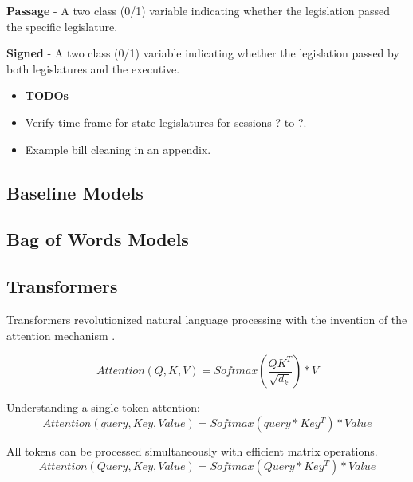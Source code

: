 \documentclass[11pt]{article}
\begin{document}
\textbf{Passage} - A two class (0/1) variable indicating whether the legislation passed the specific legislature. 

\textbf{Signed} - A two class (0/1) variable indicating whether the legislation passed by both legislatures and the executive.


\begin{itemize}
  \item \textbf{TODOs}
  \item Verify time frame for state legislatures for sessions ? to ?.
  \item Example bill cleaning in an appendix.

\end{itemize}

\subsection{Baseline Models}

\subsection{Bag of Words Models}

\subsection{Transformers}

Transformers revolutionized natural language processing with the invention of the attention mechanism \cite{attentionisallyouneed}.

\begin{equation}
Attention(Q,K,V) = Softmax(\frac{QK^T}{\sqrt{d_k}}) * V
\end{equation}


Understanding a single token attention:
\begin{equation}
Attention(query, Key, Value) = Softmax(query * Key^T) * Value
\end{equation}

All tokens can be processed simultaneously with efficient matrix operations.
\begin{equation}
Attention(Query, Key, Value) = Softmax(Query * Key^T) * Value 
\end{equation}

\end{document}
